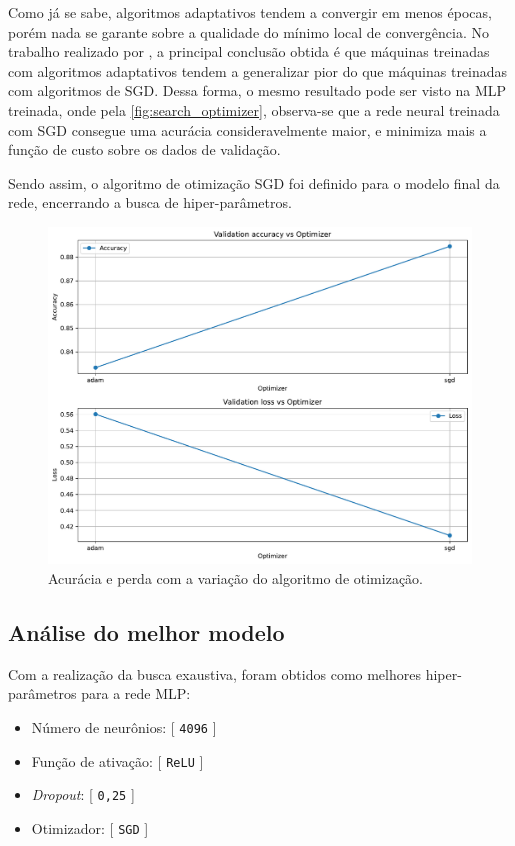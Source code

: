 	Como já se sabe, algoritmos adaptativos tendem a convergir em menos épocas, porém nada se garante sobre a qualidade do mínimo local de convergência. No trabalho realizado por , a principal conclusão obtida é que máquinas treinadas com algoritmos adaptativos tendem a generalizar pior do que máquinas treinadas com algoritmos de SGD. Dessa forma, o mesmo resultado pode ser visto na MLP treinada, onde pela \autoref{fig:search_optimizer}, observa-se que a rede neural treinada com SGD consegue uma acurácia consideravelmente maior, e minimiza mais a função de custo sobre os dados de validação.
	
	Sendo assim, o algoritmo de otimização SGD foi definido para o modelo final da rede, encerrando a busca de hiper-parâmetros.

\begin{figure}[H]
\centering
\includegraphics[width=0.65\linewidth]{../../plot/mlp/search_optimizer}
\caption{Acurácia e perda com a variação do algoritmo de otimização.}
\label{fig:search_optimizer}
\end{figure}

\subsection{Análise do melhor modelo}

	Com a realização da busca exaustiva, foram obtidos como melhores hiper-parâmetros para a rede MLP: 
	
	\begin{itemize}
		\item Número de neurônios: [ \texttt{4096} ]
		\item Função de ativação: [ \texttt{ReLU} ]
		\item \textit{Dropout}: [ \texttt{0,25} ]
		\item Otimizador: [ \texttt{SGD} ]
	\end{itemize} 

